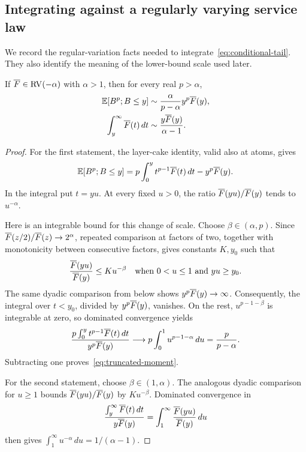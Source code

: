 \subsection{Integrating against a regularly varying service law}
We record the regular-variation facts needed to integrate~\eqref{eq:conditional-tail}. They also identify the meaning of the lower-bound scale used later.

\begin{lemma}\label{lem:rv-integrals}
If $\overline F\in\operatorname{RV}(-\alpha)$ with $\alpha>1$, then for every real $p>\alpha$,
\begin{align}
 \mathbb E[B^p;B\leq y]
   &\sim\frac{\alpha}{p-\alpha}y^p\overline F(y),\label{eq:truncated-moment}\\
 \int_y^\infty\overline F(t)\,dt
   &\sim\frac{y\overline F(y)}{\alpha-1}.\label{eq:integrated-tail}
\end{align}
\end{lemma}
\begin{proof}
For the first statement, the layer-cake identity, valid also at atoms, gives
\[
 \mathbb E[B^p;B\leq y]
 =p\int_0^y t^{p-1}\overline F(t)\,dt-y^p\overline F(y).
\]
In the integral put $t=yu$. At every fixed $u>0$, the ratio $\overline F(yu)/\overline F(y)$ tends to $u^{-\alpha}$.

Here is an integrable bound for this change of scale. Choose $\beta\in(\alpha,p)$. Since $\overline F(z/2)/\overline F(z)\to2^\alpha$, repeated comparison at factors of two, together with monotonicity between consecutive factors, gives constants $K,y_0$ such that
\[
 \frac{\overline F(yu)}{\overline F(y)}\leq K u^{-\beta}
 \quad\hbox{when }0<u\leq1\hbox{ and }yu\geq y_0.
\]
The same dyadic comparison from below shows $y^p\overline F(y)\to\infty$. Consequently, the integral over $t<y_0$, divided by $y^p\overline F(y)$, vanishes. On the rest, $u^{p-1-\beta}$ is integrable at zero, so dominated convergence yields
\[
 \frac{p\int_0^y t^{p-1}\overline F(t)\,dt}{y^p\overline F(y)}
 \longrightarrow p\int_0^1u^{p-1-\alpha}\,du
 =\frac p{p-\alpha}.
\]
Subtracting one proves~\eqref{eq:truncated-moment}.

For the second statement, choose $\beta\in(1,\alpha)$. The analogous dyadic comparison for $u\geq1$ bounds $\overline F(yu)/\overline F(y)$ by $K u^{-\beta}$. Dominated convergence in
\[
 \frac{\int_y^\infty\overline F(t)\,dt}{y\overline F(y)}
 =\int_1^\infty\frac{\overline F(yu)}{\overline F(y)}\,du
\]
then gives $\int_1^\infty u^{-\alpha}\,du=1/(\alpha-1)$.
\end{proof}

